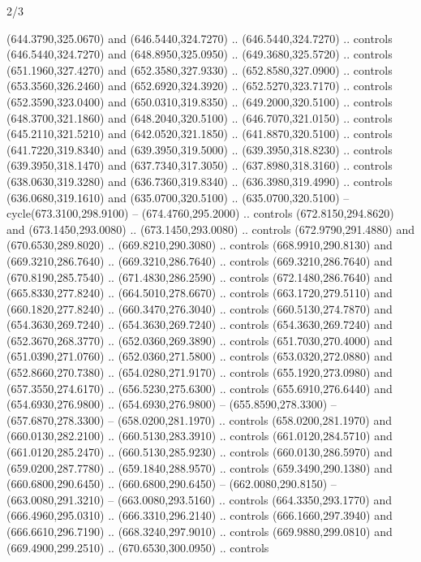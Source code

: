 \begin{flagdescription}{2/3}
\begin{scope}[xshift=0.5\flaglength,yshift=0.5\flagwidth,scale=\flagwidth/638.38]
\begin{scope}[y=0.80pt, x=0.80pt, yscale=-1,shift={(-600,-400)}]
\begin{scope}[shift={(-0.02,2.173)}]
  (644.3790,325.0670) and (646.5440,324.7270) .. (646.5440,324.7270) .. controls
  (646.5440,324.7270) and (648.8950,325.0950) .. (649.3680,325.5720) .. controls
  (651.1960,327.4270) and (652.3580,327.9330) .. (652.8580,327.0900) .. controls
  (653.3560,326.2460) and (652.6920,324.3920) .. (652.5270,323.7170) .. controls
  (652.3590,323.0400) and (650.0310,319.8350) .. (649.2000,320.5100) .. controls
  (648.3700,321.1860) and (648.2040,320.5100) .. (646.7070,321.0150) .. controls
  (645.2110,321.5210) and (642.0520,321.1850) .. (641.8870,320.5100) .. controls
  (641.7220,319.8340) and (639.3950,319.5000) .. (639.3950,318.8230) .. controls
  (639.3950,318.1470) and (637.7340,317.3050) .. (637.8980,318.3160) .. controls
  (638.0630,319.3280) and (636.7360,319.8340) .. (636.3980,319.4990) .. controls
  (636.0680,319.1610) and (635.0700,320.5100) .. (635.0700,320.5100) --
  cycle(673.3100,298.9100) -- (674.4760,295.2000) .. controls
  (672.8150,294.8620) and (673.1450,293.0080) .. (673.1450,293.0080) .. controls
  (672.9790,291.4880) and (670.6530,289.8020) .. (669.8210,290.3080) .. controls
  (668.9910,290.8130) and (669.3210,286.7640) .. (669.3210,286.7640) .. controls
  (669.3210,286.7640) and (670.8190,285.7540) .. (671.4830,286.2590) .. controls
  (672.1480,286.7640) and (665.8330,277.8240) .. (664.5010,278.6670) .. controls
  (663.1720,279.5110) and (660.1820,277.8240) .. (660.3470,276.3040) .. controls
  (660.5130,274.7870) and (654.3630,269.7240) .. (654.3630,269.7240) .. controls
  (654.3630,269.7240) and (652.3670,268.3770) .. (652.0360,269.3890) .. controls
  (651.7030,270.4000) and (651.0390,271.0760) .. (652.0360,271.5800) .. controls
  (653.0320,272.0880) and (652.8660,270.7380) .. (654.0280,271.9170) .. controls
  (655.1920,273.0980) and (657.3550,274.6170) .. (656.5230,275.6300) .. controls
  (655.6910,276.6440) and (654.6930,276.9800) .. (654.6930,276.9800) --
  (655.8590,278.3300) -- (657.6870,278.3300) -- (658.0200,281.1970) .. controls
  (658.0200,281.1970) and (660.0130,282.2100) .. (660.5130,283.3910) .. controls
  (661.0120,284.5710) and (661.0120,285.2470) .. (660.5130,285.9230) .. controls
  (660.0130,286.5970) and (659.0200,287.7780) .. (659.1840,288.9570) .. controls
  (659.3490,290.1380) and (660.6800,290.6450) .. (660.6800,290.6450) --
  (662.0080,290.8150) -- (663.0080,291.3210) -- (663.0080,293.5160) .. controls
  (664.3350,293.1770) and (666.4960,295.0310) .. (666.3310,296.2140) .. controls
  (666.1660,297.3940) and (666.6610,296.7190) .. (668.3240,297.9010) .. controls
  (669.9880,299.0810) and (669.4900,299.2510) .. (670.6530,300.0950) .. controls

\end{scope}
\end{scope}
\end{scope}
\end{flagdescription}
